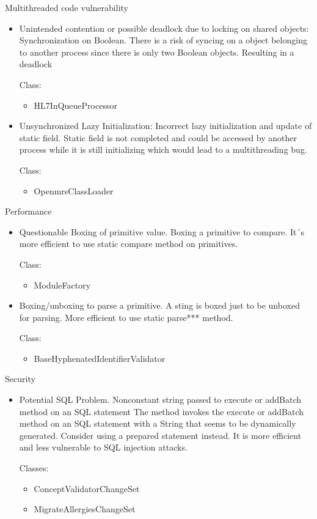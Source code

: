 \documentclass{article}
\begin{document}
Multithreaded code vulnerability
  \begin{itemize}
    \item Unintended contention or possible deadlock due to locking on shared
      objects: 
      Synchronization on Boolean. There is a risk of syncing on a object
      belonging to another process since there is only two Boolean objects.
      Resulting in a deadlock

      Class:

      \begin{itemize}
        \item HL7InQueueProcessor
      \end{itemize}
    \item Unsynchronized Lazy Initialization: 
      Incorrect lazy initialization and update of static field. Static field
      is not completed and could be accessed by another process while it is
      still initializing which would lead to a multithreading bug.

      Class:
      \begin{itemize}
          \item OpenmrsClassLoader
      \end{itemize}
  \end{itemize}
Performance
  \begin{itemize}
    \item Questionable Boxing of primitive value. 
      Boxing a primitive to compare. It´s more efficient to use static compare
      method on primitives.

      Class:
      \begin{itemize}
          \item ModuleFactory
      \end{itemize}
    \item Boxing/unboxing to parse a primitive. 
      A sting is boxed just to be unboxed for parsing. More
      efficient to use static parse*** method.

      Class:
      \begin{itemize}
        \item BaseHyphenatedIdentifierValidator
      \end{itemize}
  \end{itemize}
Security
  \begin{itemize}
    \item Potential SQL Problem. 
      Nonconstant string passed to execute or addBatch method on an SQL
      statement The method invokes the execute or addBatch method on an SQL
      statement with a String that seems to be dynamically generated.
      Consider using a prepared statement instead. It is more efficient
      and less vulnerable to SQL injection attacks. 

      Classes:
      \begin{itemize}
        \item ConceptValidatorChangeSet
        \item MigrateAllergiesChangeSet
      \end{itemize}
  \end{itemize}
\end{document}
